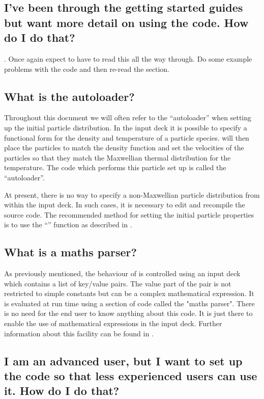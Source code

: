 \subsection{I've been through the getting started guides but want more detail
  on using the code. How do I do that?}
. Once again expect to have to read this all the way through.
Do some example problems with the code and then re-read the section.

\subsection{What is the autoloader?}
Throughout this document we will often refer to the ``autoloader'' when
setting up the initial particle distribution. In the input deck it is
possible to specify a functional form for the density and temperature 
of a particle species. {\EPOCH} will then place the particles to match
the density function and set the velocities of the particles so that they
match the Maxwellian thermal distribution for the temperature.
The code which performs this particle set up is called the ``autoloader''.

At present, there is no way to specify a non-Maxwellian particle distribution
from within the input deck. In such cases, it is necessary to edit and
recompile the {\EPOCH} source code. The recommended method for setting
the initial particle properties is to use the ``'' function
as described in .

\subsection{What is a maths parser?}
As previously mentioned, the behaviour of {\EPOCH} is controlled using an
input deck which contains a list of key/value pairs. The value part of the
pair is not restricted to simple constants but can be a complex mathematical
expression. It is evaluated at run time using a section of code called the
"maths parser". There is no need for the end user to know anything about this
code. It is just there to enable the use of mathematical expressions in the
input deck.
Further information about this facility can be found in
.

\subsection{I am an advanced user, but I want to set up the code so that less
  experienced users can use it. How do I do that?}

